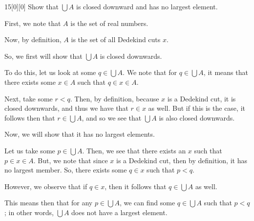 \documentclass{article}
\begin{document}
\begin{hw}{15}[0][0]
	Show that $\bigcup A$ is closed downward and has no largest element.
\end{hw}
\begin{solution}
	First, we note that $A$ is the set of real numbers.
	
	Now, by definition, $A$ is the set of all Dedekind cuts $x$.
	
	So, we first will show that $\bigcup A$ is closed downwards.
	
	To do this, let us look at some $q \in \bigcup A$. We note that for $q \in \bigcup A$, it means that there exists some $x \in A$ such that $q \in x \in A$.
	
	Next, take some $r < q$. Then, by definition, because $x$ is a Dedekind cut, it is closed downwards, and thus we have that $r \in x$ as well. But if this is the case, it follows then that $r \in \bigcup A$, and so we see that $\bigcup A$ is also closed downwards.
	
	Now, we will show that it has no largest elements.
	
	Let us take some $p \in \bigcup A$. Then, we see that there exists an $x$ such that $p \in x \in A$. But, we note that since $x$ is a Dedekind cut, then by definition, it has no largest member. So, there exists some $q \in x$ such that $p < q$.
	
	However, we observe that if $q \in x$, then it follows that $q \in \bigcup A$ as well.
	
	This means then that for any $p \in \bigcup A$, we can find some $q \in \bigcup A$ such that $p < q$; in other words, $\bigcup A$ does not have a largest element.
\end{solution}
\end{document}
